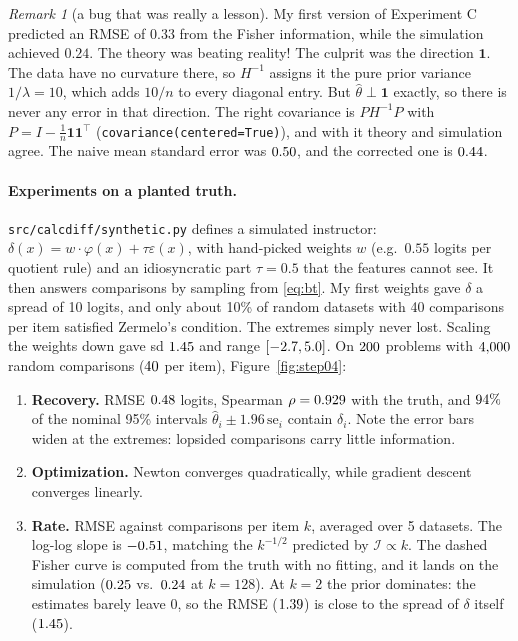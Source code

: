 \documentclass[11pt]{article}
\theoremstyle{definition}
\theoremstyle{plain}
\theoremstyle{remark}
\newtheorem{remark}[definition]{Remark}
\newcommand{\code}[1]{\texttt{#1}}
\renewcommand{\_}{\oldunderscore\allowbreak}
\newcommand{\file}[1]{\textcolor{blue!50!black}{\texttt{#1}}}
\begin{document}
\begin{remark}[a bug that was really a lesson]
My first version of Experiment C predicted an RMSE of $0.33$ from the Fisher information, while the simulation
achieved $0.24$. The theory was beating reality! The culprit was the direction $\mathbf 1$. The data have no
curvature there, so $H^{-1}$ assigns it the pure prior variance $1/\lambda=10$, which adds $10/n$ to every
diagonal entry. But $\hat\theta\perp\mathbf 1$ exactly, so there is never any error in that direction. The right covariance is
$PH^{-1}P$ with $P=I-\frac1n\mathbf 1\mathbf 1^\top$ (\code{covariance(centered=True)}), and with it theory and
simulation agree. The naive mean standard error was $0.50$, and the corrected one is $0.44$.
\end{remark}

\paragraph{Experiments on a planted truth.}
\file{src/calcdiff/synthetic.py} defines a simulated instructor: $\delta(x)=w\cdot\varphi(x)+\tau\varepsilon(x)$, with
hand-picked weights $w$ (e.g.\ $0.55$ logits per quotient rule) and an idiosyncratic part $\tau=0.5$ that the
features cannot see. It then answers comparisons by sampling from \eqref{eq:bt}. My first weights gave $\delta$ a spread
of 10 logits, and only about 10\% of random datasets with 40 comparisons per item satisfied Zermelo's condition. The extremes simply never lost. Scaling the weights
down gave sd $1.45$ and range $[-2.7,5.0]$. On $200$ problems with $4{,}000$ random comparisons
($40$ per item), Figure~\ref{fig:step04}:
\begin{enumerate}[nosep,label=(\alph*)]
\item \textbf{Recovery.} RMSE $0.48$ logits, Spearman $\rho=0.929$ with the truth, and $94\%$ of the
  nominal 95\% intervals $\hat\theta_i\pm1.96\,\mathrm{se}_i$ contain $\delta_i$. Note the error bars widen at the
  extremes: lopsided comparisons carry little information.
\item \textbf{Optimization.} Newton converges quadratically, while gradient descent converges linearly.
\item \textbf{Rate.} RMSE against comparisons per item $k$, averaged over 5 datasets. The log-log slope is $-0.51$,
  matching the $k^{-1/2}$ predicted by $\mathcal I\propto k$. The dashed Fisher curve is computed from the truth with no fitting,
  and it lands on the simulation ($0.25$ vs.\ $0.24$ at $k=128$). At $k=2$ the prior dominates: the
  estimates barely leave 0, so the RMSE ($1.39$) is close to the spread of $\delta$ itself ($1.45$).
\end{enumerate}
\end{document}
